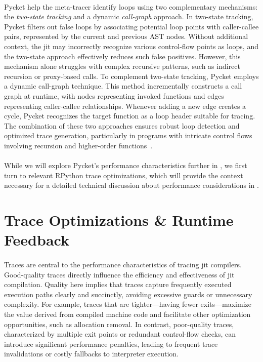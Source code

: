        \paragraph{}%
            Pycket help the meta-tracer identify loops using two complementary mechanisms: the \emph{two-state tracking} and a dynamic \emph{call-graph} approach. In two-state tracking, Pycket filters out false loops by associating potential loop points with caller-callee pairs, represented by the current and previous AST nodes. Without additional context, the \gls{jit} may incorrectly recognize various control-flow points as loops, and the two-state approach effectively reduces such false positives. However, this mechanism alone struggles with complex recursive patterns, such as indirect recursion or proxy-based calls. To complement two-state tracking, Pycket employs a dynamic call-graph technique. This method incrementally constructs a call graph at runtime, with nodes representing invoked functions and edges representing caller-callee relationships. Whenever adding a new edge creates a cycle, Pycket recognizes the target function as a loop header suitable for tracing. The combination of these two approaches ensures robust loop detection and optimized trace generation, particularly in programs with intricate control flows involving recursion and higher-order functions~\cite{pycketmain, pycketmain2}.

        \paragraph{}%
            While we will explore Pycket’s performance characteristics further in , we first turn to relevant RPython trace optimizations, which will provide the context necessary for a detailed technical discussion about performance considerations in .

    \section[\texorpdfstring{Trace Optimizations \& Runtime Feedback}{Trace Optimizations}]{Trace Optimizations \& Runtime Feedback}

        \paragraph{}%
            Traces are central to the performance characteristics of tracing \gls{jit} compilers. Good-quality traces directly influence the efficiency and effectiveness of \gls{jit} compilation. Quality here implies that traces capture frequently executed execution paths clearly and succinctly, avoiding excessive guards or unnecessary complexity. For example, traces that are tighter—having fewer exits—maximize the value derived from compiled machine code and facilitate other optimization opportunities, such as allocation removal. In contrast, poor-quality traces, characterized by multiple exit points or redundant control-flow checks, can introduce significant performance penalties, leading to frequent trace invalidations or costly fallbacks to interpreter execution. \cite{runtime-feedback:11}


